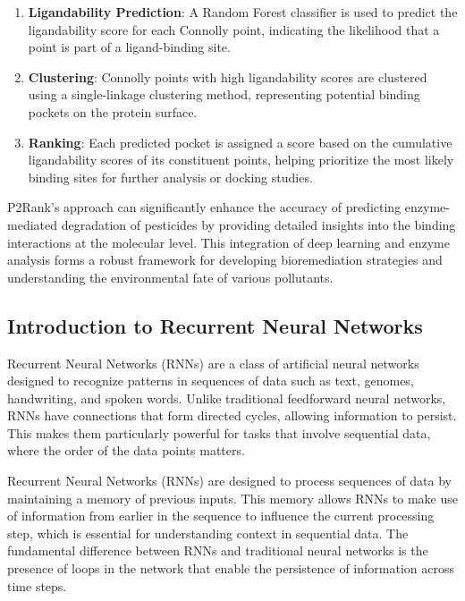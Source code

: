 \begin{enumerate}
\begin{figure}[hbt]
\begin{minipage}[t]{.9\textwidth}
            \label{fig:p2rank}
            \end{minipage}
        \end{figure}
    \item \textbf{Ligandability Prediction}: A Random Forest classifier is used to predict the ligandability score for each Connolly point, indicating the likelihood that a point is part of a ligand-binding site.
    \item \textbf{Clustering}: Connolly points with high ligandability scores are clustered using a single-linkage clustering method, representing potential binding pockets on the protein surface.
    \item \textbf{Ranking}: Each predicted pocket is assigned a score based on the cumulative ligandability scores of its constituent points, helping prioritize the most likely binding sites for further analysis or docking studies.
\end{enumerate}

P2Rank's approach can significantly enhance the accuracy of predicting enzyme-mediated degradation of pesticides by providing detailed insights into the binding interactions at the molecular level. This integration of deep learning and enzyme analysis forms a robust framework for developing bioremediation strategies and understanding the environmental fate of various pollutants. \autocite{krivakP2RankMachineLearning2018}

\subsection{Introduction to Recurrent Neural Networks}
\label{sec:Introduction to Recurrent Neural Networks}

Recurrent Neural Networks (RNNs) are a class of artificial neural networks designed to recognize patterns in sequences of data such as text, genomes, handwriting, and spoken words. Unlike traditional feedforward neural networks, RNNs have connections that form directed cycles, allowing information to persist. This makes them particularly powerful for tasks that involve sequential data, where the order of the data points matters.

Recurrent Neural Networks (RNNs) are designed to process sequences of data by maintaining a memory of previous inputs. This memory allows RNNs to make use of information from earlier in the sequence to influence the current processing step, which is essential for understanding context in sequential data. The fundamental difference between RNNs and traditional neural networks is the presence of loops in the network that enable the persistence of information across time steps.

